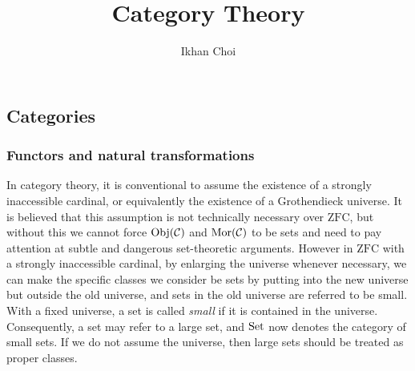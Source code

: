 \documentclass{../../large}
\begin{document}
\title{Category Theory}
\author{Ikhan Choi}
\maketitle
\tableofcontents


\part{}

\chapter{Categories}


\section{Functors and natural transformations}


\begin{prb}
In category theory, it is conventional to assume the existence of a strongly inaccessible cardinal, or equivalently the existence of a Grothendieck universe.
It is believed that this assumption is not technically necessary over $\mathrm{ZFC}$, but without this we cannot force $\operatorname{Obj}(\mathcal{C})$ and $\operatorname{Mor}(\mathcal{C})$ to be sets and need to pay attention at subtle and dangerous set-theoretic arguments.
However in $\mathrm{ZFC}$ with a strongly inaccessible cardinal, by enlarging the universe whenever necessary, we can make the specific classes we consider be sets by putting into the new universe but outside the old universe, and sets in the old universe are referred to be small.
With a fixed universe, a set is called \emph{small} if it is contained in the universe.
Consequently, a set may refer to a large set, and $\operatorname{Set}$ now denotes the category of small sets.
If we do not assume the universe, then large sets should be treated as proper classes.
\end{prb}
\end{document}
